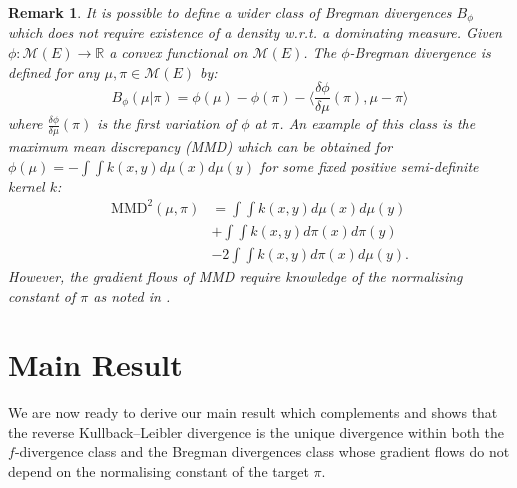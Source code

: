 \documentclass{article}
\newcommand{\cM}{\mathcal M}
\newcommand{\R}{\mathbb R}
\newcommand{\X}{E}
\newcommand{\ssp}[1]{\langle #1 \rangle}
\newtheorem{remark}{Remark}
\begin{document}
\begin{remark}
    It is possible to define a wider class of Bregman divergences $B_\phi$ which does not require existence of a density w.r.t. a dominating measure. Given  $\phi:\cM(\X)\rightarrow \R$ a convex functional on $\cM(\X)$. The $\phi$-Bregman divergence is defined for any $\mu, \pi \in \cM(\X)$ by:
\begin{equation*}
     B_{\phi}(\mu|\pi)=\phi(\mu)-\phi(\pi)-\ssp{\frac{\delta \phi}{\delta \mu}(\pi), \mu- \pi}
\end{equation*}
where $\frac{\delta \phi}{\delta \mu}(\pi)$ is the first variation of $\phi$ at $\pi$.
An example of this class is the maximum mean discrepancy (MMD) \citep{JMLR:v13:gretton12a} which can be obtained for $\phi(\mu) = -\int\int k(x,y)d\mu(x)d\mu(y)$  for some fixed positive semi-definite kernel $k$:
\begin{align*}
    \textrm{MMD}^2(\mu, \pi) %
    &=\int\int k(x,y)d\mu(x)d\mu(y)\\
    &+\int\int k(x,y)d\pi(x)d\pi(y)\\
    &-2\int\int k(x,y)d\pi(x)d\mu(y).
\end{align*}
However, the gradient flows of MMD require knowledge of the normalising constant of $\pi$ as noted in \cite{arbel2019maximum}.
\end{remark}


\section{Main Result}

We are now ready to derive our main result which complements \citet[Theorem 3.1]{chen2023sampling} and shows that the reverse Kullback--Leibler divergence is the unique divergence within both the $f$-divergence class and the Bregman divergences class whose gradient flows do not depend on the normalising constant of the target $\pi$.
\end{document}
